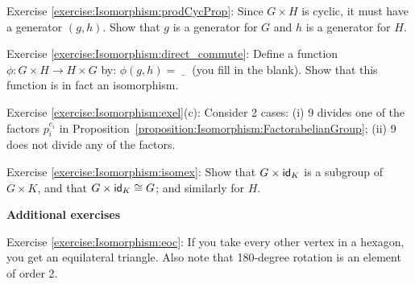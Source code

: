 \noindent Exercise \ref{exercise:Isomorphism:prodCycProp}: Since $G \times H$ is cyclic, it must have a generator $(g,h)$.  Show that $g$ is a generator for $G$ and $h$ is a generator for $H$.


\noindent Exercise \ref{exercise:Isomorphism:direct_commute}:
 Define a function $\phi:G \times H \rightarrow H \times G$ by:  $\phi(g,h) = \underline{~~~~}$ (you fill in the blank).  Show that this function is in fact an isomorphism. 

\noindent Exercise \ref{exercise:Isomorphism:exel}(c): Consider 2 cases: (i) 9 divides one of the factors $p_i^{e_i}$ in Proposition~\ref{proposition:Isomorphism:FactorabelianGroup}; (ii) 9 does not divide any of the factors.

\noindent Exercise \ref{exercise:Isomorphism:isomex}:  Show that $G \times {\sf{i}d}_K$ is a subgroup of $G \times K$, and that $G \times {\sf{i}d}_K \cong G$; and similarly for $H$.
\medskip

\textbf{Additional exercises}

\noindent Exercise \ref{exercise:Isomorphism:eoc}: If you take every other vertex in a hexagon, you get an equilateral triangle. Also note that 180-degree rotation is an element of order 2.

